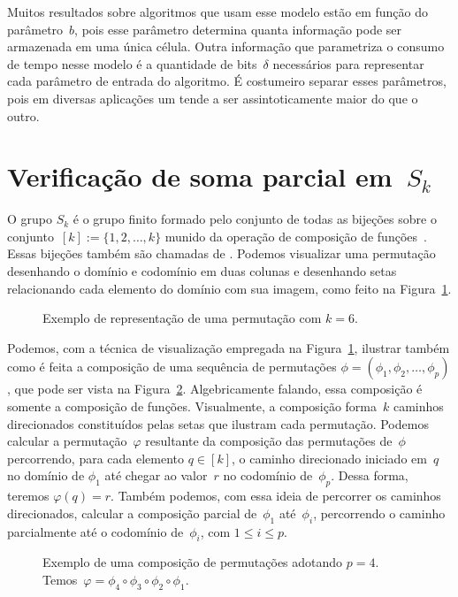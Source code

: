 Muitos resultados sobre algoritmos que usam esse modelo estão em função do parâmetro~$b$, pois esse parâmetro determina quanta informação pode ser armazenada em uma única célula. Outra informação que parametriza o consumo de tempo nesse modelo é a quantidade de bits~$\delta$ necessários para representar cada parâmetro de entrada do algoritmo. É costumeiro separar esses parâmetros, pois em diversas aplicações um tende a ser assintoticamente maior do que o outro.

\section{Verificação de soma parcial em~$S_k$}
\label{sec:lim-verificacao-Sk}

O grupo $S_k$ é o grupo finito formado pelo conjunto de todas as bijeções sobre o conjunto~${[k]:=\{1,2,\ldots,k\}}$ munido da operação de composição de funções~\cite{agozine2010}. Essas bijeções também são chamadas de . Podemos visualizar uma permutação desenhando o domínio e codomínio em duas colunas e desenhando setas relacionando cada elemento do domínio com sua imagem, como feito na Figura~\ref{fig:LIM-exemplo-uma-perm}.

\begin{figure}[htb]
\centering

\caption{Exemplo de representação de uma permutação com $k=6$.}
\label{fig:LIM-exemplo-uma-perm}
\end{figure}

Podemos, com a técnica de visualização empregada na Figura~\ref{fig:LIM-exemplo-uma-perm}, ilustrar também como é feita a composição de uma sequência de permutações ${\phi=(\phi_1, \phi_2, \ldots, \phi_p)}$, que pode ser vista na Figura~\ref{fig:LIM-exemplo-comp}. Algebricamente falando, essa composição é somente a composição de funções. Visualmente, a composição forma~$k$ caminhos direcionados constituídos pelas setas que ilustram cada permutação. Podemos calcular a permutação~$\varphi$ resultante da composição das permutações de~$\phi$ percorrendo, para cada elemento $q\in [k]$, o caminho direcionado iniciado em~$q$ no domínio de $\phi_1$ até chegar ao valor~$r$ no codomínio de~$\phi_p$. Dessa forma, teremos $\varphi(q)=r$. Também podemos, com essa ideia de percorrer os caminhos direcionados, calcular a composição parcial de~$\phi_1$ até~$\phi_i$, percorrendo o caminho parcialmente até o codomínio de~$\phi_i$, com $1\leqslant i \leqslant p$.

\begin{figure}[htb]
\centering

\caption{Exemplo de uma composição de permutações adotando $p=4$. Temos~$\varphi = \phi_4\circ \phi_3\circ \phi_2\circ \phi_1$.}
\label{fig:LIM-exemplo-comp}
\end{figure}

